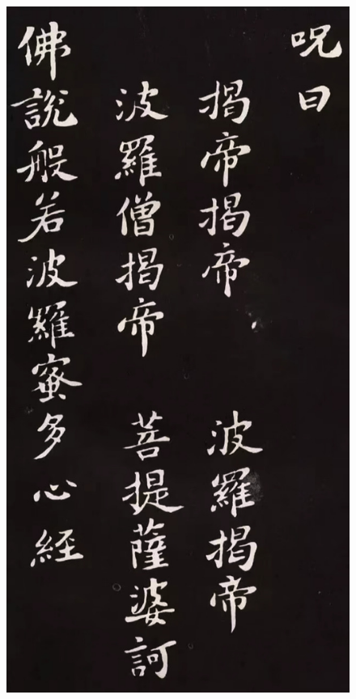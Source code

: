 \documentclass[a4paper,twoside]{article}
\begin{document}
\begin{figure}[ht]
\centering
\includegraphics[width=12.2cm]{images/sushi-6}
\end{figure}
\end{document}
